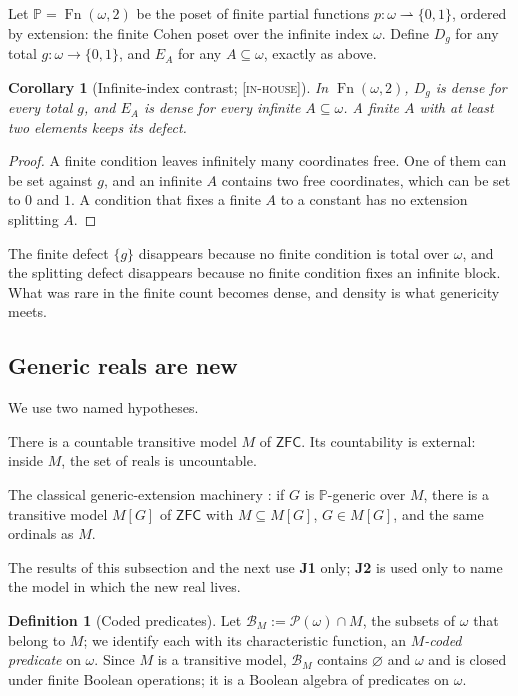\documentclass[11pt]{article}
\newcommand{\powset}{\mathcal{P}}
\newcommand{\Cgen}{\mathbb{P}}                 \newcommand{\Fn}{\operatorname{Fn}}
\newcommand{\gradetag}[1]{\textnormal{\textsc{[#1]}}}
\newcommand{\inhouse}{\gradetag{in-house}}
\newtheorem{corollary}[theorem]{Corollary}
\theoremstyle{definition}
\newtheorem{definition}[theorem]{Definition}
\begin{document}
Let $\Cgen=\Fn(\omega,2)$ be the poset of finite partial functions $p\colon\omega
\rightharpoonup\{0,1\}$, ordered by extension: the finite Cohen poset over the infinite index
$\omega$. Define $D_g$ for any total $g\colon\omega\to\{0,1\}$, and $E_A$ for any $A\subseteq\omega$,
exactly as above.

\begin{corollary}[Infinite-index contrast; \inhouse]\label{cor:infinitecontrast}
In $\Fn(\omega,2)$, $D_g$ is dense for every total $g$, and $E_A$ is dense for every
\emph{infinite} $A\subseteq\omega$. A finite $A$ with at least two elements keeps its defect.
\end{corollary}

\begin{proof}
A finite condition leaves infinitely many coordinates free. One of them can be set against $g$,
and an infinite $A$ contains two free coordinates, which can be set to $0$ and $1$. A condition
that fixes a finite $A$ to a constant has no extension splitting $A$.
\end{proof}

The finite defect $\{g\}$ disappears because no finite condition is total over $\omega$, and the
splitting defect disappears because no finite condition fixes an infinite block. What was rare in
the finite count becomes dense, and density is what genericity meets.

\subsection{Generic reals are new}\label{ssec:genericity}

We use two named hypotheses.
\begin{description}[leftmargin=1.2em]
\item[\textbf{J1}.] There is a countable transitive model $M$ of $\mathsf{ZFC}$. Its countability
is external: inside $M$, the set of reals is uncountable.
\item[\textbf{J2}.] The classical generic-extension machinery \citep{Cohen1966,Kunen2011}: if $G$
is $\Cgen$-generic over $M$, there is a transitive model $M[G]$ of $\mathsf{ZFC}$ with
$M\subseteq M[G]$, $G\in M[G]$, and the same ordinals as $M$.
\end{description}
The results of this subsection and the next use \textbf{J1} only; \textbf{J2} is used only to name
the model in which the new real lives.

\begin{definition}[Coded predicates]\label{def:groundlens}
Let $\mathcal B_M:=\powset(\omega)\cap M$, the subsets of $\omega$ that belong to $M$; we identify
each with its characteristic function, an \emph{$M$-coded predicate} on $\omega$. Since $M$ is a
transitive model, $\mathcal B_M$ contains $\varnothing$ and $\omega$ and is closed under finite
Boolean operations; it is a Boolean algebra of predicates on $\omega$.
\end{definition}
\end{document}
